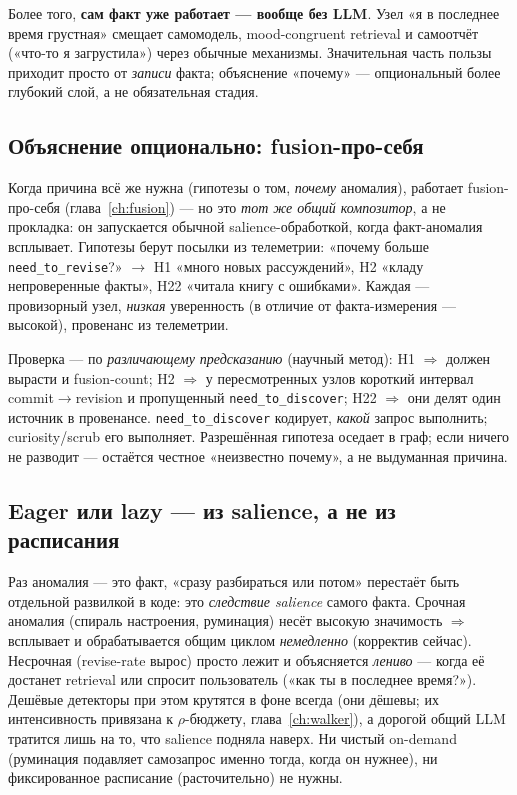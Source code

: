 Более того, \textbf{сам факт уже работает — вообще без LLM}. Узел «я в последнее
время грустная» смещает самомодель, mood-congruent retrieval и самоотчёт («что-то я
загрустила») через обычные механизмы. Значительная часть пользы приходит просто от
\emph{записи} факта; объяснение «почему» — опциональный более глубокий слой, а не
обязательная стадия.

\subsection*{Объяснение опционально: fusion-про-себя}

Когда причина всё же нужна (гипотезы о том, \emph{почему} аномалия), работает
fusion-про-себя (глава~\ref{ch:fusion}) — но это \emph{тот же общий композитор}, а
не прокладка: он запускается обычной salience-обработкой, когда факт-аномалия
всплывает. Гипотезы берут посылки из телеметрии: «почему больше
\texttt{need\_to\_revise}?» $\to$ H1 «много новых рассуждений», H2 «кладу
непроверенные факты», H22 «читала книгу с ошибками». Каждая — провизорный узел,
\emph{низкая} уверенность (в отличие от факта-измерения — высокой), провенанс из
телеметрии.

Проверка — по \emph{различающему предсказанию} (научный метод): H1 $\Rightarrow$
должен вырасти и fusion-count; H2 $\Rightarrow$ у пересмотренных узлов короткий
интервал commit$\to$revision и пропущенный \texttt{need\_to\_discover}; H22
$\Rightarrow$ они делят один источник в провенансе. \texttt{need\_to\_discover}
кодирует, \emph{какой} запрос выполнить; curiosity/scrub его выполняет. Разрешённая
гипотеза оседает в граф; если ничего не разводит — остаётся честное «неизвестно
почему», а не выдуманная причина.

\subsection*{Eager или lazy — из salience, а не из расписания}

Раз аномалия — это факт, «сразу разбираться или потом» перестаёт быть отдельной
развилкой в коде: это \emph{следствие salience} самого факта. Срочная аномалия
(спираль настроения, руминация) несёт высокую значимость $\Rightarrow$ всплывает и
обрабатывается общим циклом \emph{немедленно} (корректив сейчас). Несрочная
(revise-rate вырос) просто лежит и объясняется \emph{лениво} — когда её достанет
retrieval или спросит пользователь («как ты в последнее время?»). Дешёвые детекторы
при этом крутятся в фоне всегда (они дёшевы; их интенсивность привязана к
$\rho$-бюджету, глава~\ref{ch:walker}), а дорогой общий LLM тратится лишь на то, что
salience подняла наверх. Ни чистый on-demand (руминация подавляет самозапрос именно
тогда, когда он нужнее), ни фиксированное расписание (расточительно) не нужны.


